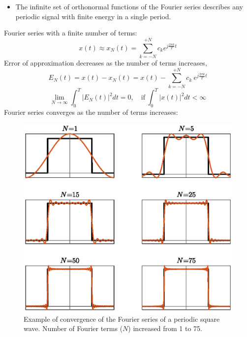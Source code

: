 \begin{itemize}
    \item The infinite set of orthonormal functions of the Fourier series describes any periodic signal with finite energy in a single period.
\end{itemize}

\begin{tcolorbox}[breakable]
Fourier series with a finite number of terms:
\[ x(t) \approx x_{N}(t) = \sum_{k=-N}^{+N} c_{k} e^{j\frac{2\pi k}{T}t} \]
Error of approximation decreases as the number of terms increases,
\[ E_{N}(t) = x(t)-x_{N}(t) = x(t)- \sum_{k=-N}^{+N} c_{k} \ e^{j\frac{2\pi k}{T}t} \]
\[ \lim_{N \to \infty} \int_{0}^{T} \lvert E_{N}(t) \rvert^{2} dt = 0, \quad \text{if} \ \int_{0}^{T} \lvert x(t) \rvert^{2} dt < \infty \] 
Fourier series converges as the number of terms increases:
\begin{figure}[H]
    \centering
    \includegraphics[width = \textwidth]{images/fSeries_terms.eps}
    \caption{Example of convergence of the Fourier series of a periodic square wave. Number of Fourier terms ($N$) increased from 1 to 75.} 
\end{figure}
\end{tcolorbox}

